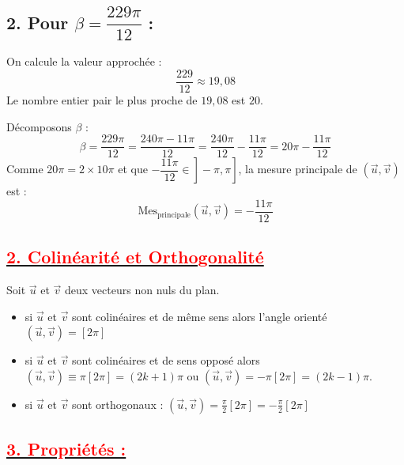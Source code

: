 \documentclass[12pt,a4paper]{article}
\begin{document}
\vspace{0.8cm}

\subsection*{\textcolor{myblue}{2. Pour $\beta = \dfrac{229\pi}{12}$ :}}

On calcule la valeur approchée :
\[
\frac{229}{12} \approx 19{,}08
\]
Le nombre entier pair le plus proche de $19{,}08$ est $20$.

Décomposons $\beta$ :
\[
\beta = \frac{229\pi}{12} = \frac{240\pi - 11\pi}{12} = \frac{240\pi}{12} - \frac{11\pi}{12} = 20\pi - \frac{11\pi}{12}
\]
Comme $20\pi = 2 \times 10\pi$ et que $\left.\left.-\dfrac{11\pi}{12} \in \right]-\pi, \pi\right]$, la mesure principale de $(\vec{u}, \vec{v})$ est :
\[
\text{Mes}_{\text{principale}}(\vec{u}, \vec{v}) = -\frac{11\pi}{12}
\]

\subsection*{\underline{\textbf{\textcolor{red}{2. Colinéarité et Orthogonalité }}}}

Soit $\vec{u}$ et $\vec{v}$ deux vecteurs non nuls du plan.\\
\begin{itemize}
\item  si $\vec{u}$ et $\vec{v}$ sont colinéaires et de même sens alors l'angle orienté $(\vec{u}, \vec{v}) = [2\pi]$\\
\item si $\vec{u}$ et $\vec{v}$ sont colinéaires et de sens opposé alors $(\vec{u}, \vec{v}) \equiv \pi[2\pi] = (2k + 1)\pi$ ou $(\vec{u}, \vec{v}) = -\pi[2\pi] = (2k - 1)\pi$.\\
\item si $\vec{u}$ et $\vec{v}$ sont orthogonaux : $(\vec{u}, \vec{v}) = \frac{\pi}{2}[2\pi] = -\frac{\pi}{2}[2\pi]$
\end{itemize}

\subsection*{\underline{\textbf{\textcolor{red}{3. Propriétés : }}}}
\end{document}
